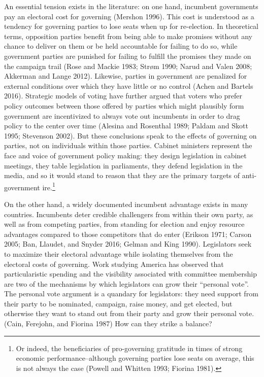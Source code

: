 \documentclass[letter,12pt]{article}
\begin{document}
An essential tension exists in the literature: on one hand, incumbent governments pay an electoral cost for governing (Mershon 1996). This cost is understood as a tendency for governing parties to lose seats when up for re-election. In theoretical terms, opposition parties benefit from being able to make promises without any chance to deliver on them or be held accountable for failing to do so, while government parties are punished for failing to fulfill the promises they made on the campaign trail (Rose and Mackie 1983; Str{\o}m 1990; Narud and Valen 2008; Akkerman and Lange 2012). Likewise, parties in government are penalized for external conditions over which they have little or no control (Achen and Bartels 2016). Strategic models of voting have further argued that voters who prefer policy outcomes between those offered by parties which might plausibly form government are incentivized to always vote out incumbents in order to drag policy to the center over time (Alesina and Rosenthal 1989; Paldam and Skott 1995; Stevenson 2002). But these conclusions speak to the effects of governing on parties, not on individuals within those parties. Cabinet ministers represent the face and voice of government policy making: they design legislation in cabinet meetings, they table legislation in parliaments, they defend legislation in the media, and so it would stand to reason that they are the primary targets of anti-government ire.\footnote{Or indeed, the beneficiaries of pro-governing gratitude in times of strong economic performance--although governing parties lose seats on average, this is not always the case (Powell and Whitten 1993; Fiorina 1981).}

On the other hand, a widely documented incumbent advantage exists in many countries. Incumbents deter credible challengers from within their own party, as well as from competing parties, from standing for election and enjoy resource advantages compared to those competitors that do enter (Erikson 1971; Carson 2005; Ban, Llaudet, and Snyder 2016; Gelman and King 1990). Legislators seek to maximize their electoral advantage while isolating themselves from the electoral costs of governing. Work studying America has observed that particularistic spending and the visibility associated with committee membership are two of the mechanisms by which legislators can grow their ``personal vote''. The personal vote argument is a quandary for legislators: they need support from their party to be nominated, campaign, raise money, and get elected, but otherwise they want to stand out from their party and grow their personal vote. (Cain, Ferejohn, and Fiorina 1987) How can they strike a balance?
\end{document}

